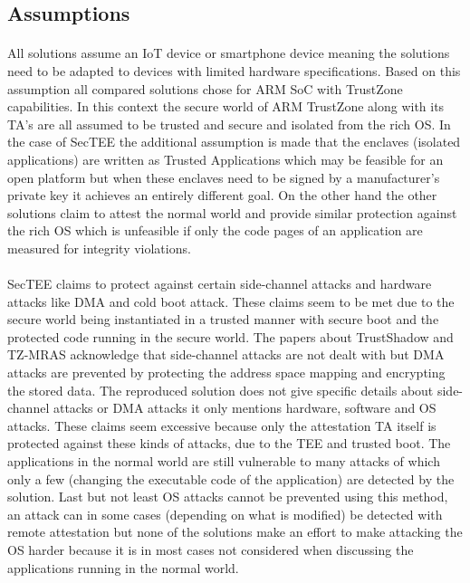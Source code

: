\subsection*{Assumptions}

\paragraph*{}
All solutions assume an IoT device or smartphone device meaning the solutions need to be adapted to devices with limited hardware specifications. Based on this assumption all compared solutions chose for ARM SoC with TrustZone capabilities. In this context the secure world of ARM TrustZone along with its TA's are all assumed to be trusted and secure and isolated from the rich OS. In the case of SecTEE the additional assumption is made that the enclaves (isolated applications) are written as Trusted Applications which may be feasible for an open platform but when these enclaves need to be signed by a manufacturer's private key it achieves an entirely different goal. On the other hand the other solutions claim to attest the normal world and provide similar protection against the rich OS which is unfeasible if only the code pages of an application are measured for integrity violations. 

\paragraph*{}
SecTEE claims to protect against certain side-channel attacks and hardware attacks like DMA and cold boot attack. These claims seem to be met due to the secure world being instantiated in a trusted manner with secure boot and the protected code running in the secure world. The papers about TrustShadow and TZ-MRAS acknowledge that side-channel attacks are not dealt with but DMA attacks are prevented by protecting the address space mapping and encrypting the stored data. The reproduced solution does not give specific details about side-channel attacks or DMA attacks it only mentions hardware, software and OS attacks. These claims seem excessive because only the attestation TA itself is protected against these kinds of attacks, due to the TEE and trusted boot. The applications in the normal world are still vulnerable to many attacks of which only a few (changing the executable code of the application) are detected by the solution. Last but not least OS attacks cannot be prevented using this method, an attack can in some cases (depending on what is modified) be detected with remote attestation but none of the solutions make an effort to make attacking the OS harder because it is in most cases not considered when discussing the applications running in the normal world.

